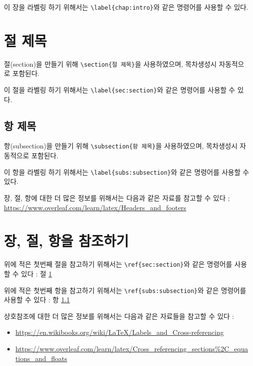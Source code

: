 \documentclass{report}
\begin{document}
이 장을 라벨링 하기 위해서는 \verb|\label{chap:intro}|와 같은 명령어를 사용할 수 있다.

\section{절 제목}\label{sec:section}
절(section)을 만들기 위해 \verb|\section{절 제목}|을 사용하였으며, 목차생성시 자동적으로 포함된다.

이 절을 라벨링 하기 위해서는 \verb|\label{sec:section}|와 같은 명령어를 사용할 수 있다.

%
\subsection{항 제목}\label{subs:subsection}
항(subsection)을 만들기 위해 \verb|\subsection{항 제목}|을 사용하였으며, 목차생성시 자동적으로 포함된다.

이 항을 라벨링 하기 위해서는 \verb|\label{subs:subsection}|와 같은 명령어를 사용할 수 있다.

장, 절, 항에 대한 더 많은 정보를 위해서는 다음과 같은 자료를 참고할 수 있다 ; \url{https://www.overleaf.com/learn/latex/Headers_and_footers}

%
\section{장, 절, 항을 참조하기}\label{sec:referencing}
위에 적은 첫번째 절을 참고하기 위해서는 \verb|\ref{sec:section}|와 같은 명령어를 사용할 수 있다 : 절 \ref{sec:section}

위에 적은 첫번째 항을 참고하기 위해서는 \verb|\ref{subs:subsection}|와 같은 명령어를 사용할 수 있다 : 항 \ref{subs:subsection}

상호참조에 대한 더 많은 정보를 위해서는 다음과 같은 자료들을 참고할 수 있다 :
\begin{itemize}
\item
\url{https://en.wikibooks.org/wiki/LaTeX/Labels_and_Cross-referencing}
\item
\url{https://www.overleaf.com/learn/latex/Cross_referencing_sections%2C_equations_and_floats}
\end{itemize}
\end{document}
